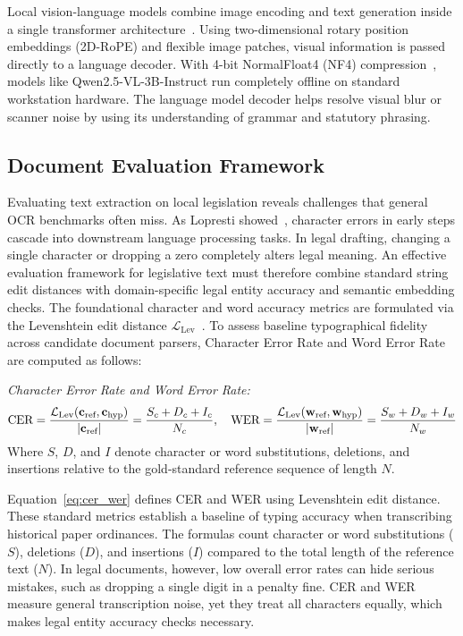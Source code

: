 Local vision-language models combine image encoding and text generation inside a single transformer architecture~\cite{bai2025qwen25vl}. Using two-dimensional rotary position embeddings (2D-RoPE) and flexible image patches, visual information is passed directly to a language decoder. With 4-bit NormalFloat4 (NF4) compression~\cite{dettmers2024qlora}, models like Qwen2.5-VL-3B-Instruct run completely offline on standard workstation hardware. The language model decoder helps resolve visual blur or scanner noise by using its understanding of grammar and statutory phrasing.


\subsection{Document Evaluation Framework}
Evaluating text extraction on local legislation reveals challenges that general OCR benchmarks often miss. As Lopresti showed~\cite{lopresti2008optical}, character errors in early steps cascade into downstream language processing tasks. In legal drafting, changing a single character or dropping a zero completely alters legal meaning. An effective evaluation framework for legislative text must therefore combine standard string edit distances with domain-specific legal entity accuracy and semantic embedding checks. The foundational character and word accuracy metrics are formulated via the Levenshtein edit distance $\mathcal{L}_{\text{Lev}}$~\cite{levenshtein1966binary}. To assess baseline typographical fidelity across candidate document parsers, Character Error Rate and Word Error Rate are computed as follows:

\noindent\textit{Character Error Rate and Word Error Rate:}
\begin{equation}
    \text{CER} = \frac{\mathcal{L}_{\text{Lev}}(\mathbf{c}_{\text{ref}}, \mathbf{c}_{\text{hyp}})}{|\mathbf{c}_{\text{ref}}|} = \frac{S_c + D_c + I_c}{N_c}, \quad
    \text{WER} = \frac{\mathcal{L}_{\text{Lev}}(\mathbf{w}_{\text{ref}}, \mathbf{w}_{\text{hyp}})}{|\mathbf{w}_{\text{ref}}|} = \frac{S_w + D_w + I_w}{N_w}
    \label{eq:cer_wer}
    \eqcaption{Character Error Rate (CER) and Word Error Rate (WER)}
\end{equation}
\noindent Where $S$, $D$, and $I$ denote character or word substitutions, deletions, and insertions relative to the gold-standard reference sequence of length $N$.

Equation~\ref{eq:cer_wer} defines CER and WER using Levenshtein edit distance. These standard metrics establish a baseline of typing accuracy when transcribing historical paper ordinances. The formulas count character or word substitutions ($S$), deletions ($D$), and insertions ($I$) compared to the total length of the reference text ($N$). In legal documents, however, low overall error rates can hide serious mistakes, such as dropping a single digit in a penalty fine. CER and WER measure general transcription noise, yet they treat all characters equally, which makes legal entity accuracy checks necessary.

